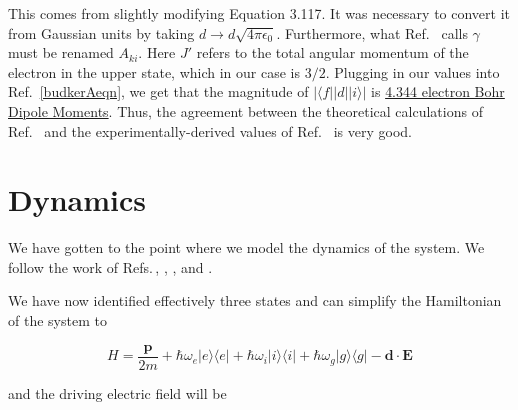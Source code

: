 This comes from slightly modifying Equation 3.117. It was necessary to convert it from Gaussian units by taking $d\rightarrow d \sqrt{4 \pi \epsilon_0}$. Furthermore, what Ref.\ \cite{demilleBudkerKimball} calls $\gamma$ must be renamed $A_{ki}$. Here $J'$ refers to the total angular momentum of the electron in the upper state, which in our case is $3/2$. Plugging in our values into Ref.\ \ref{budkerAeqn}, we get that the magnitude of $|\langle f ||d|| i \rangle|$ is \href{http://www.wolframalpha.com/input/?i=sqrt%283*hbar*c%5E3%2F%284*%282*pi*c%2F407.771+nm%29%5E3%29*4*pi*epsilon_0*4*1.41e8*1%2Fs%29}{4.344 electron Bohr Dipole Moments}.
Thus, the agreement between the theoretical calculations of Ref.\ \cite{safronova2photon} and the experimentally-derived values of Ref.\ \cite{NISTasd} is very good.  


%



\section{Dynamics}

We have gotten to the point where we model the dynamics of the system. We follow the work of Refs.\,\cite{Young1997363}, \cite{gustavsonThesis}, \cite{footAtomicPhysics}, \cite{cjeDiss} and \cite{RamanBeamSplit}.

We have now identified effectively three states and can simplify the Hamiltonian of the system to 

\begin{equation}
H=\frac{\mathbf{p}}{2m} + 
\hbar\omega_e |e\rangle\langle e | +
\hbar\omega_i |i\rangle\langle i | +
\hbar\omega_g |g\rangle\langle g | -
\mathbf{d}\cdot\mathbf{E}
\end{equation}

and the driving electric field will be

